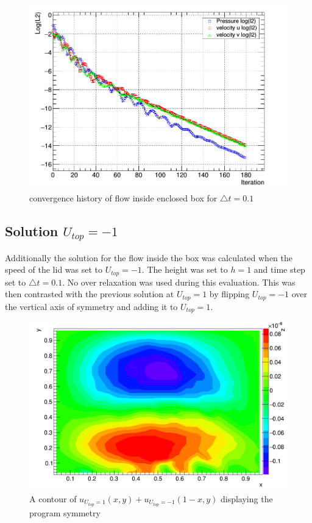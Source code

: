 \documentclass[paper=a4, fontsize=11pt, abstract=on]{scrartcl}
\numberwithin{equation}{section}		%
\numberwithin{figure}{section}			%
\numberwithin{table}{section}				%
\begin{document}
\begin{figure}[H]
\centering
\includegraphics[width=0.80\linewidth]{con3}
\caption{convergence history of flow inside enclosed box for $\triangle t = 0.1$}
\label{conh}
\end{figure}

\subsection{Solution $U_{top} = -1$}
Additionally the solution for the flow inside the box was calculated when the speed of the lid was set to $U_{top} = -1$. The height was set to $h=1$ and time step set to $\triangle t = 0.1$. No over relaxation was used during this evaluation. This was then contrasted with the previous solution at $U_{top} = 1$ by flipping $U_{top} = -1$ over the vertical axis of symmetry and adding it to 
$U_{top} = 1$. 
\begin{figure}[H]
\centering
\includegraphics[width=0.80\linewidth]{sanity}
\caption{A contour of $u_{U_{top} = 1}(x,y) + u_{U_{top} = -1}(1-x,y)$ displaying the program symmetry}
\label{san1}
\end{figure}
\end{document}
